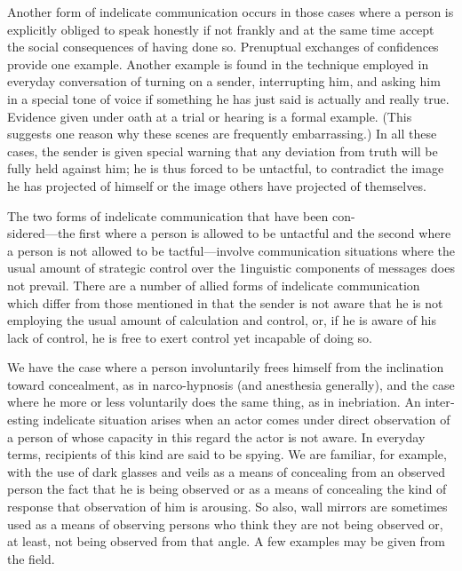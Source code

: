 \documentclass[twoside,symmetric,nobib,justified]{tufte-book}
\begin{document}
Another form of indelicate communication occurs in those cases where a
person is explicitly obliged to speak honestly if not frankly and at the
same time accept the social consequences of having done so. Prenuptual
exchanges of confidences provide one example. Another example is found
in the technique employed in everyday conversation of turning on a
sender, interrupting him, and asking him in a special tone of voice if
something he has just said is actually and really true. Evidence given
under oath at a trial or hearing is a formal example. (This suggests one
reason why these scenes are frequently embarrassing.) In all these
cases, the sender is given special warning that any deviation from truth
will be fully held against him; he is thus forced to be untactful, to
contradict the image he has projected of himself or the image others
have projected of themselves.

The two forms of indelicate communication that have been
con-\\\noindent sidered---the first where a person is allowed to be untactful and the
second where a person is not allowed to be tactful---in­volve
communication situations where the usual amount of stra­tegic control
over the 1inguistic components of messages does not prevail. There are a
number of allied forms of indelicate communication which differ from
those mentioned in that the sender is not aware that he is not employing
the usual amount of calculation and control, or, if he is aware of his
lack of con­trol, he is free to exert control yet incapable of doing so.

We have the case where a person involuntarily frees him­self from the
inclination toward concealment, as in narco-hypnosis (and anesthesia
generally), and the case where he more or less voluntarily does the same
thing, as in inebriation. An inter­esting indelicate situation arises
when an actor comes under direct observation of a person of whose
capacity in this regard the actor is not aware. In everyday terms,
recipients of this kind are said to be spying. We are familiar, for
example, with the use of dark glasses and veils as a means of concealing
from an observed person the fact that he is being observed or as a means
of concealing the kind of response that observation of him is arousing.
So also, wall mirrors are sometimes used as a means of observing persons
who think they are not being observed or, at least, not being observed
from that angle. A few examples may be given from the field.
\end{document}
